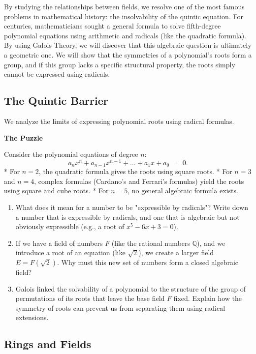 \documentclass[12pt, a4paper]{article}
\newenvironment{puzzlebox}
  {\par\medskip\fillcolorbox{LightGold}{PuzzleColor}{The Puzzle}}
  {\par\medskip}
\newcommand{\fillcolorbox}[3]{%
  \noindent
  \filldrawbox{#1}{#2}{\textbf{\sffamily\color{white}#3}}\par\nobreak\vspace{4pt}
}
\newcommand{\filldrawbox}[3]{%
  \colorbox{#1}{\parbox{\dimexpr\linewidth-2\fboxsep\relax}{%
    \vspace{4pt}\noindent\hspace{4pt}#3\vspace{4pt}%
  }}%
}
\begin{document}
By studying the relationships between fields, we resolve one of the most famous problems in mathematical history: the insolvability of the quintic equation.
For centuries, mathematicians sought a general formula to solve fifth-degree polynomial equations using arithmetic and radicals (like the quadratic formula).
By using Galois Theory, we will discover that this algebraic question is ultimately a geometric one.
We will show that the symmetries of a polynomial's roots form a group, and if this group lacks a specific structural property, the roots simply cannot be expressed using radicals.

\subsection{The Quintic Barrier}

We analyze the limits of expressing polynomial roots using radical formulas.

\begin{puzzlebox}
Consider the polynomial equations of degree $n$:
\[
  a_n x^n + a_{n-1} x^{n-1} + \dots + a_1 x + a_0 \;=\; 0.
\]
* For $n=2$, the quadratic formula gives the roots using square roots.
* For $n=3$ and $n=4$, complex formulas (Cardano's and Ferrari's formulas) yield the roots using square and cube roots.
* For $n=5$, no general algebraic formula exists.
\begin{enumerate}[label=(\alph*), leftmargin=*]
  \item What does it mean for a number to be "expressible by radicals"?
        Write down a number that is expressible by radicals, and one that is algebraic but not obviously expressible (e.g., a root of $x^5 - 6x + 3 = 0$).
  \item If we have a field of numbers $F$ (like the rational numbers $\mathbb{Q}$), and we introduce a root of an equation (like $\sqrt{2}$), we create a larger field $E = F(\sqrt{2})$.
        Why must this new set of numbers form a closed algebraic field?
  \item Galois linked the solvability of a polynomial to the structure of the group of permutations of its roots that leave the base field $F$ fixed.
        Explain how the symmetry of roots can prevent us from separating them using radical extensions.
\end{enumerate}
\end{puzzlebox}

\subsection{Rings and Fields}
\end{document}
